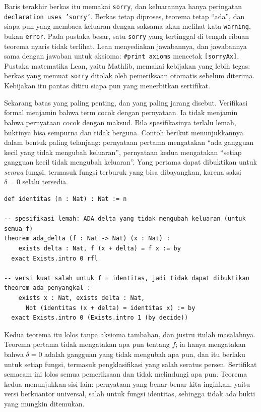 
Baris terakhir berkas itu memakai \texttt{sorry}, dan keluarannya hanya peringatan
\texttt{declaration uses 'sorry'}. Berkas tetap diproses, teorema tetap ``ada'', dan siapa pun
yang membaca keluaran dengan saksama akan melihat kata \texttt{warning}, bukan \texttt{error}.
Pada pustaka besar, satu \texttt{sorry} yang tertinggal di tengah ribuan teorema nyaris tidak
terlihat. Lean menyediakan jawabannya, dan jawabannya sama dengan jawaban untuk aksioma:
\texttt{\#print axioms} mencetak \texttt{[sorryAx]}. Pustaka matematika Lean, yaitu Mathlib,
memakai kebijakan yang lebih tegas: berkas yang memuat \texttt{sorry} ditolak oleh pemeriksaan
otomatis sebelum diterima. Kebijakan itu pantas ditiru siapa pun yang menerbitkan sertifikat.


Sekarang batas yang paling penting, dan yang paling jarang disebut. Verifikasi formal menjamin
bahwa term cocok dengan pernyataan. Ia tidak menjamin bahwa pernyataan cocok dengan maksud. Bila
spesifikasinya terlalu lemah, buktinya bisa sempurna dan tidak berguna. Contoh berikut
menunjukkannya dalam bentuk paling telanjang: pernyataan pertama mengatakan ``ada gangguan kecil
yang tidak mengubah keluaran'', pernyataan kedua mengatakan ``setiap gangguan kecil tidak
mengubah keluaran''. Yang pertama dapat dibuktikan untuk \emph{semua} fungsi, termasuk fungsi
terburuk yang bisa dibayangkan, karena saksi $\delta=0$ selalu tersedia.

\begin{verbatim}
def identitas (n : Nat) : Nat := n

-- spesifikasi lemah: ADA delta yang tidak mengubah keluaran (untuk semua f)
theorem ada_delta (f : Nat -> Nat) (x : Nat) :
    exists delta : Nat, f (x + delta) = f x := by
  exact Exists.intro 0 rfl

-- versi kuat salah untuk f = identitas, jadi tidak dapat dibuktikan
theorem ada_penyangkal :
    exists x : Nat, exists delta : Nat,
      Not (identitas (x + delta) = identitas x) := by
  exact Exists.intro 0 (Exists.intro 1 (by decide))
\end{verbatim}

Kedua teorema itu lolos tanpa aksioma tambahan, dan justru itulah masalahnya. Teorema pertama
tidak mengatakan apa pun tentang $f$; ia hanya mengatakan bahwa $\delta=0$ adalah gangguan yang
tidak mengubah apa pun, dan itu berlaku untuk setiap fungsi, termasuk pengklasifikasi yang salah
seratus persen. Sertifikat semacam ini lolos semua pemeriksaan dan tidak melindungi apa pun.
Teorema kedua menunjukkan sisi lain: pernyataan yang benar-benar kita inginkan, yaitu versi
berkuantor universal, salah untuk fungsi identitas, sehingga tidak ada bukti yang mungkin
ditemukan.

